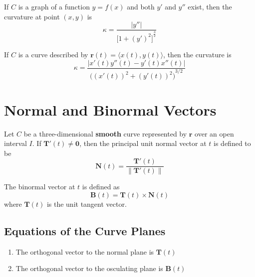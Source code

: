 \documentclass{article}
\begin{document}
If $C$ is a graph of a function $y=f(x)$ and both $y'$ and $y''$ exist, then the curvature at point $(x, y)$ is
\[\kappa = \frac{|y''|}{{\Big[1+{(y')}^2\Big]}^\frac{3}{2}}\]

If $C$ is a curve described by $\mathbf{r}(t)=\langle x(t), y(t) \rangle$, then the curvature is
\[\kappa = \frac{|x'(t)y''(t)-y'(t)x''(t)|}{{\Big({(x'(t))}^2+{(y'(t))}^2\Big)}^{3/2}}\]

\section*{Normal and Binormal Vectors}

Let $C$ be a three-dimensional \textbf{smooth} curve represented by $\mathbf{r}$ over an open interval $I$. If $\mathbf{T}'(t)\neq\mathbf{0}$, then the principal unit normal vector at $t$ is defined to be
\[\mathbf{N}(t)=\frac{\mathbf{T}'(t)}{\|\mathbf{T}'(t)\|}\]

The binormal vector at $t$ is defined as
\[\mathbf{B}(t)=\mathbf{T}(t)\times\mathbf{N}(t)\]
where $\mathbf{T}(t)$ is the unit tangent vector.

\subsection*{Equations of the Curve Planes}
\begin{enumerate}
    \item The orthogonal vector to the normal plane is $\mathbf{T}(t)$
    \item The orthogonal vector to the osculating plane is $\mathbf{B}(t)$
\end{enumerate}
\end{document}

